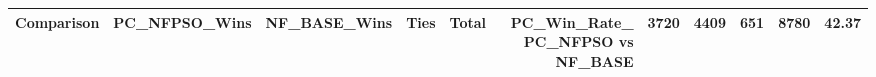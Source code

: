 \begin{tabular}{lrrrrr}
\toprule
Comparison & PC_NFPSO_Wins & NF_BASE_Wins & Ties & Total & PC_Win_Rate_%
\midrule
PC_NFPSO vs NF_BASE & 3720 & 4409 & 651 & 8780 & 42.37 \\
\bottomrule
\end{tabular}
